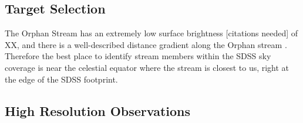 \documentclass{emulateapj}
\begin{document}

\subsection{Target Selection}
The Orphan Stream has an extremely low surface brightness [citations needed] of XX, and there is a well-described distance gradient along the Orphan stream \citep{Belokurov;et-al_2007,Newberg;et-al_2010}. Therefore the best place to identify stream members within the SDSS sky coverage is near the celestial equator where the stream is closest to us, right at the edge of the SDSS footprint.


\subsection{High Resolution Observations}
\end{document}
